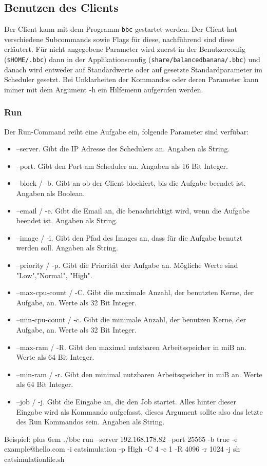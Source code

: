 \documentclass[a4paper,12pt]{article}
\makeatletter
\newenvironment{mycode}
 {\def\@xobeysp{\ }\verbatim\rightskip=0pt plus 6em\relax}
 {\endverbatim}
\makeatother
\begin{document}
\subsection{Benutzen des Clients}
Der Client kann mit dem Programm \texttt{bbc} gestartet werden. Der Client hat verschiedene Subcommands sowie Flags für diese, nachführend sind diese erläutert. Für nicht angegebene Parameter wird zuerst in der Benutzerconfig (\texttt{\$HOME/.bbc}) dann in der Applikationsconfig (\texttt{share/balancedbanana/.bbc}) und danach wird entweder auf Standardwerte oder auf gesetzte Standardparameter im Scheduler gesetzt.
Bei Unklarheiten der Kommandos oder deren Parameter kann immer mit dem Argument -h ein Hilfemenü aufgerufen werden.
\subsubsection{Run}
Der Run-Command reiht eine Aufgabe ein, folgende Parameter sind verfübar:
\begin{itemize}
\item --server. Gibt die IP Adresse des Schedulers an. Angaben als String.
\item --port. Gibt den Port am Scheduler an. Angaben als 16 Bit Integer.	
\item --block / -b. Gibt an ob der Client blockiert, bis die Aufgabe beendet ist. Angaben als Boolean.
\item --email / -e. Gibt die Email an, die benachrichtigt wird, wenn die Aufgabe beendet ist. Angaben als String.
\item --image / -i. Gibt den Pfad des Images an, dass für die Aufgabe benutzt werden soll.  Angaben als String.
\item --priority / -p. Gibt die Priorität der Aufgabe an. Mögliche Werte sind "Low","Normal", "High".
\item --max-cpu-count / -C. Gibt die maximale Anzahl, der benutzten Kerne, der Aufgabe, an. Werte als 32 Bit Integer.
\item --min-cpu-count / -c. Gibt die minimale Anzahl, der benutzen Kerne, der Aufgabe, an. Werte als 32 Bit Integer.
\item --max-ram / -R. Gibt den maximal nutzbaren Arbeitsspeicher in miB an. Werte als 64 Bit Integer.
\item --min-ram / -r. Gibt den minimal nutzbaren Arbeitsspeicher in miB an. Werte als 64 Bit Integer.
\item --job / -j. Gibt die Eingabe an, die den Job startet. Alles hinter dieser Eingabe wird als Kommando aufgefasst, dieses Argument sollte also das letzte des Run Kommandos sein. Angaben als String.
\end{itemize}
Beispiel: \newline
\begin{mycode}
	./bbc run --server 192.168.178.82 --port 25565 -b true -e example@hello.com -i catsimulation -p High -C 4 -c 1 -R 4096 -r 1024 -j sh catsimulationfile.sh
\end{mycode}
\end{document}

